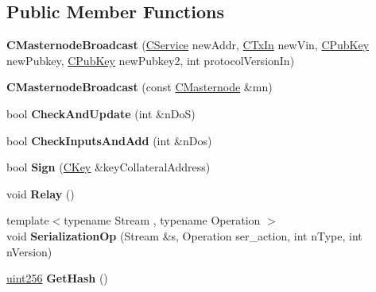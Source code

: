 \subsection*{Public Member Functions}
\begin{DoxyCompactItemize}
\item 
\mbox{\label{class_c_masternode_broadcast_ae74dd3f7c12e22286adf47ea4918048c}} 
{\bfseries C\+Masternode\+Broadcast} (\mbox{\hyperlink{class_c_service}{C\+Service}} new\+Addr, \mbox{\hyperlink{class_c_tx_in}{C\+Tx\+In}} new\+Vin, \mbox{\hyperlink{class_c_pub_key}{C\+Pub\+Key}} new\+Pubkey, \mbox{\hyperlink{class_c_pub_key}{C\+Pub\+Key}} new\+Pubkey2, int protocol\+Version\+In)
\item 
\mbox{\label{class_c_masternode_broadcast_ad85a19b0a20ea5ad6a65bc98fcd40cea}} 
{\bfseries C\+Masternode\+Broadcast} (const \mbox{\hyperlink{class_c_masternode}{C\+Masternode}} \&mn)
\item 
\mbox{\label{class_c_masternode_broadcast_a3692f64d331acb81af066806a685eceb}} 
bool {\bfseries Check\+And\+Update} (int \&n\+DoS)
\item 
\mbox{\label{class_c_masternode_broadcast_af62fbef289c7a262da6fcd6cfadeda3c}} 
bool {\bfseries Check\+Inputs\+And\+Add} (int \&n\+Dos)
\item 
\mbox{\label{class_c_masternode_broadcast_a60496c36bcb74c3f5516faac1a08b376}} 
bool {\bfseries Sign} (\mbox{\hyperlink{class_c_key}{C\+Key}} \&key\+Collateral\+Address)
\item 
\mbox{\label{class_c_masternode_broadcast_a54fc9e822e1524bee8852a0bf6d82736}} 
void {\bfseries Relay} ()
\item 
\mbox{\label{class_c_masternode_broadcast_a6e697696503e9416437067cb33edc084}} 
{\footnotesize template$<$typename Stream , typename Operation $>$ }\\void {\bfseries Serialization\+Op} (Stream \&s, Operation ser\+\_\+action, int n\+Type, int n\+Version)
\item 
\mbox{\label{class_c_masternode_broadcast_a0ada325e5672c4cd178cf02cdc0a7bd5}} 
\mbox{\hyperlink{classuint256}{uint256}} {\bfseries Get\+Hash} ()
\end{DoxyCompactItemize}
